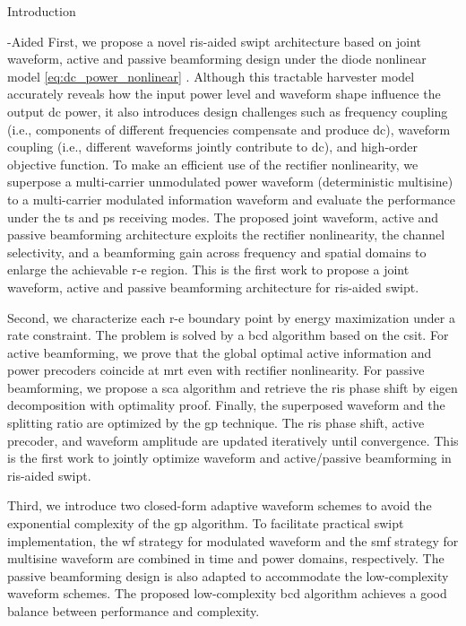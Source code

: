 \begin{section}{Introduction}
\begin{subsection}{-Aided }
		First, we propose a novel \gls{ris}-aided \gls{swipt} architecture based on joint waveform, active and passive beamforming design under the diode nonlinear model \eqref{eq:dc_power_nonlinear} \cite{Clerckx2016a}. Although this tractable harvester model accurately reveals how the input power level and waveform shape influence the output \gls{dc} power, it also introduces design challenges such as frequency coupling (i.e., components of different frequencies compensate and produce \gls{dc}), waveform coupling (i.e., different waveforms jointly contribute to \gls{dc}), and high-order objective function. To make an efficient use of the rectifier nonlinearity, we superpose a multi-carrier unmodulated power waveform (deterministic multisine) to a multi-carrier modulated information waveform and evaluate the performance under the \gls{ts} and \gls{ps} receiving modes. The proposed joint waveform, active and passive beamforming architecture exploits the rectifier nonlinearity, the channel selectivity, and a beamforming gain across frequency and spatial domains to enlarge the achievable \gls{r-e} region. This is the first work to propose a joint waveform, active and passive beamforming architecture for \gls{ris}-aided \gls{swipt}.

		Second, we characterize each \gls{r-e} boundary point by energy maximization under a rate constraint. The problem is solved by a \gls{bcd} algorithm based on the \gls{csit}. For active beamforming, we prove that the global optimal active information and power precoders coincide at \gls{mrt} even with rectifier nonlinearity. For passive beamforming, we propose a \gls{sca} algorithm and retrieve the \gls{ris} phase shift by eigen decomposition with optimality proof. Finally, the superposed waveform and the splitting ratio are optimized by the \gls{gp} technique. The \gls{ris} phase shift, active precoder, and waveform amplitude are updated iteratively until convergence. This is the first work to jointly optimize waveform and active/passive beamforming in \gls{ris}-aided \gls{swipt}.

		Third, we introduce two closed-form adaptive waveform schemes to avoid the exponential complexity of the \gls{gp} algorithm. To facilitate practical \gls{swipt} implementation, the \gls{wf} strategy for modulated waveform and the \gls{smf} strategy for multisine waveform are combined in time and power domains, respectively. The passive beamforming design is also adapted to accommodate the low-complexity waveform schemes. The proposed low-complexity \gls{bcd} algorithm achieves a good balance between performance and complexity.


\end{subsection}
\end{section}
